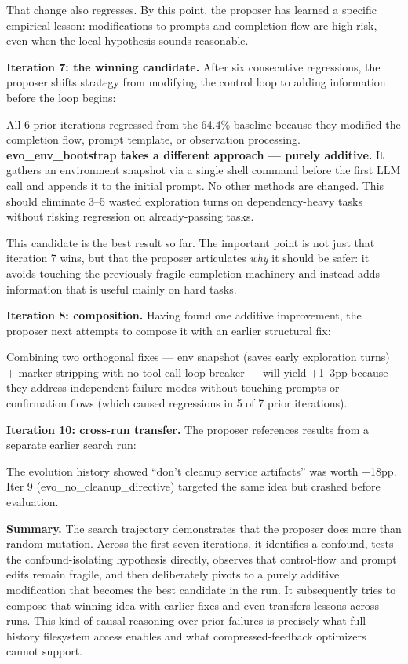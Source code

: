That change also regresses.
By this point, the proposer has learned a specific empirical lesson: modifications to prompts and completion flow are high risk, even when the local hypothesis sounds reasonable.

\textbf{Iteration 7: the winning candidate.}
After six consecutive regressions, the proposer shifts strategy from modifying the control loop to adding information before the loop begins:

\begin{logbox}
All 6 prior iterations regressed from the 64.4\% baseline because they modified the completion flow, prompt template, or observation processing. \textbf{evo\_env\_bootstrap takes a different approach --- purely additive.} It gathers an environment snapshot via a single shell command before the first LLM call and appends it to the initial prompt. No other methods are changed. This should eliminate 3--5 wasted exploration turns on dependency-heavy tasks without risking regression on already-passing tasks.
\end{logbox}

This candidate is the best result so far.
The important point is not just that iteration 7 wins, but that the proposer articulates \emph{why} it should be safer: it avoids touching the previously fragile completion machinery and instead adds information that is useful mainly on hard tasks.

\textbf{Iteration 8: composition.}
Having found one additive improvement, the proposer next attempts to compose it with an earlier structural fix:

\begin{logbox}
Combining two orthogonal fixes --- env snapshot (saves early exploration turns) + marker stripping with no-tool-call loop breaker --- will yield +1--3pp because they address independent failure modes without touching prompts or confirmation flows (which caused regressions in 5 of 7 prior iterations).
\end{logbox}

\textbf{Iteration 10: cross-run transfer.}
The proposer references results from a separate earlier search run:

\begin{logbox}
The evolution history showed ``don't cleanup service artifacts'' was worth +18pp. Iter 9 (evo\_no\_cleanup\_directive) targeted the same idea but crashed before evaluation.
\end{logbox}

\textbf{Summary.}
The search trajectory demonstrates that the proposer does more than random mutation.
Across the first seven iterations, it identifies a confound, tests the confound-isolating hypothesis directly, observes that control-flow and prompt edits remain fragile, and then deliberately pivots to a purely additive modification that becomes the best candidate in the run.
It subsequently tries to compose that winning idea with earlier fixes and even transfers lessons across runs.
This kind of causal reasoning over prior failures is precisely what full-history filesystem access enables and what compressed-feedback optimizers cannot support.

